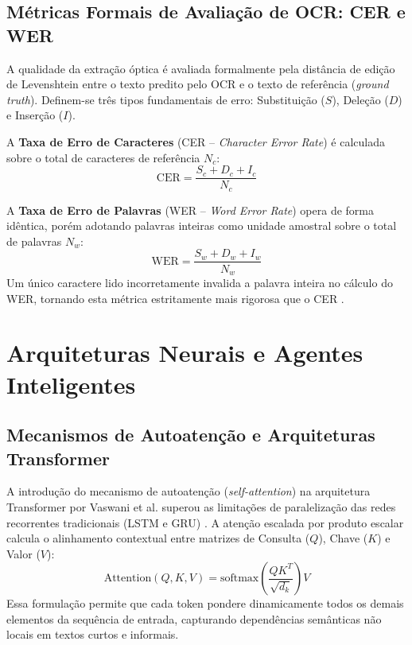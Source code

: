 \documentclass[
	12pt,				
	openright,			
	oneside,			
	a4paper,			
	english,			
	brazil				
	]{abntex2}
\begin{document}
\subsection{Métricas Formais de Avaliação de OCR: CER e WER}
A qualidade da extração óptica é avaliada formalmente pela distância de edição de Levenshtein entre o texto predito pelo OCR e o texto de referência (\textit{ground truth}). Definem-se três tipos fundamentais de erro: Substituição ($S$), Deleção ($D$) e Inserção ($I$).

A \textbf{Taxa de Erro de Caracteres} (CER -- \textit{Character Error Rate}) é calculada sobre o total de caracteres de referência $N_c$:
\begin{equation}
    \text{CER} = \frac{S_c + D_c + I_c}{N_c}
\end{equation}

A \textbf{Taxa de Erro de Palavras} (WER -- \textit{Word Error Rate}) opera de forma idêntica, porém adotando palavras inteiras como unidade amostral sobre o total de palavras $N_w$:
\begin{equation}
    \text{WER} = \frac{S_w + D_w + I_w}{N_w}
\end{equation}
Um único caractere lido incorretamente invalida a palavra inteira no cálculo do WER, tornando esta métrica estritamente mais rigorosa que o CER \cite{araujo2024saneamento}.

\section{Arquiteturas Neurais e Agentes Inteligentes}
\label{sec:fund_arquiteturas_agentes}

\subsection{Mecanismos de Autoatenção e Arquiteturas Transformer}
A introdução do mecanismo de autoatenção (\textit{self-attention}) na arquitetura Transformer por Vaswani et al. \cite{vaswani2017attention} superou as limitações de paralelização das redes recorrentes tradicionais (LSTM e GRU) \cite{hochreiter1997long, cho2014learning}. A atenção escalada por produto escalar calcula o alinhamento contextual entre matrizes de Consulta ($Q$), Chave ($K$) e Valor ($V$):
\begin{equation}
    \text{Attention}(Q, K, V) = \text{softmax}\left(\frac{QK^T}{\sqrt{d_k}}\right)V
\end{equation}
Essa formulação permite que cada token pondere dinamicamente todos os demais elementos da sequência de entrada, capturando dependências semânticas não locais em textos curtos e informais.
\end{document}
